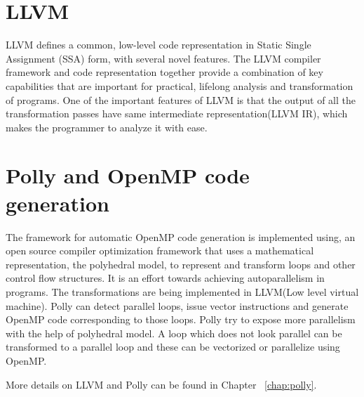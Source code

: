 \section{LLVM}
LLVM defines a common, low-level code representation in Static Single Assignment
(SSA) form, with several novel features. The LLVM compiler framework and code
representation together provide a combination of key capabilities that are
important for practical, lifelong analysis and transformation of programs.
One of the important features of LLVM is that the output of all the
transformation passes have same intermediate representation(LLVM IR), which
makes the programmer to analyze it with ease.

\section{Polly and OpenMP code generation}
The framework for automatic OpenMP code generation is implemented using,
an open source\cite{lice} compiler  optimization framework that uses a mathematical
 representation, the polyhedral model, to represent and transform loops and other
 control flow structures. It is an effort towards achieving autoparallelism in programs.
 The transformations are being implemented in LLVM(Low level virtual machine). 
Polly can detect parallel loops, issue vector instructions and generate OpenMP code 
corresponding to those loops. Polly try to expose more parallelism
with the help of polyhedral model. A loop which does not look parallel can be transformed
to a parallel loop and these can be vectorized or parallelize using OpenMP.

More details on LLVM and Polly can be found in Chapter  ~\ref{chap:polly}.

